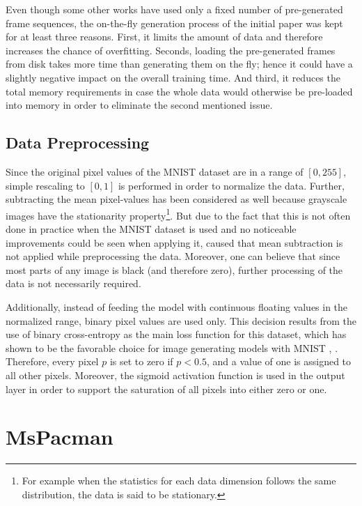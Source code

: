 Even though some other works have used only a fixed number of pre-generated frame sequences, the on-the-fly generation process of the initial paper was kept for at least three reasons. First, it limits the amount of data and therefore increases the chance of overfitting. Seconds, loading the pre-generated frames from disk takes more time than generating them on the fly; hence it could have a slightly negative impact on the overall training time. And third, it reduces the total memory requirements in case the whole data would otherwise be pre-loaded into memory in order to eliminate the second mentioned issue.

\subsection{Data Preprocessing}

Since the original pixel values of the MNIST dataset are in a range of $[0, 255]$, simple rescaling to $[0, 1]$ is performed in order to normalize the data. Further, subtracting the mean pixel-values has been considered as well because grayscale images have the stationarity property\footnote{For example when the statistics for each data dimension follows the same distribution, the data is said to be stationary.}. But due to the fact that this is not often done in practice when the MNIST dataset is used \parencite{stanford_data_pre} and no noticeable improvements could be seen when applying it, caused that mean subtraction is not applied while preprocessing the data. Moreover, one can believe that since most parts of any image is black (and therefore zero), further processing of the data is not necessarily required.

Additionally, instead of feeding the model with continuous floating values in the normalized range, binary pixel values are used only. This decision results from the use of binary cross-entropy as the main loss function for this dataset, which has shown to be the favorable choice for image generating models with MNIST \parencite{unsup_learn_lstm}, \parencite{conv_lstm_nowcasting}. Therefore, every pixel $p$ is set to zero if $p < \num{0.5} $, and a value of one is assigned to all other pixels. Moreover, the sigmoid activation function is used in the output layer in order to support the saturation of all pixels into either zero or one.

\section{MsPacman} \label{sec:ds_pac}

